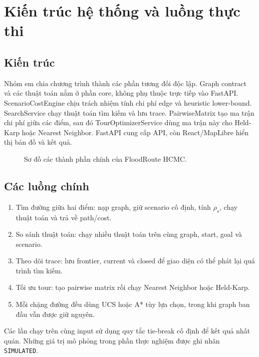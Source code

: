 \section{Kiến trúc hệ thống và luồng thực thi}
\subsection{Kiến trúc}
Nhóm em chia chương trình thành các phần tương đối độc lập. Graph contract và các thuật toán nằm ở phần core, không phụ thuộc trực tiếp vào FastAPI. ScenarioCostEngine chịu trách nhiệm tính chi phí edge và heuristic lower-bound. SearchService chạy thuật toán tìm kiếm và lưu trace. PairwiseMatrix tạo ma trận chi phí giữa các điểm, sau đó TourOptimizerService dùng ma trận này cho Held-Karp hoặc Nearest Neighbor. FastAPI cung cấp API, còn React/MapLibre hiển thị bản đồ và kết quả.

\begin{figure}[htbp]
\centering
{}
\caption{Sơ đồ các thành phần chính của FloodRoute HCMC.}
\label{fig:architecture-flow}
\end{figure}

\subsection{Các luồng chính}
\begin{enumerate}
\item Tìm đường giữa hai điểm: nạp graph, giữ scenario cố định, tính \(\rho_s\), chạy thuật toán và trả về path/cost.
\item So sánh thuật toán: chạy nhiều thuật toán trên cùng graph, start, goal và scenario.
\item Theo dõi trace: lưu frontier, current và closed để giao diện có thể phát lại quá trình tìm kiếm.
\item Tối ưu tour: tạo pairwise matrix rồi chạy Nearest Neighbor hoặc Held-Karp.
\item Mỗi chặng đường đều dùng UCS hoặc A* tùy lựa chọn, trong khi graph ban đầu vẫn được giữ nguyên.
\end{enumerate}

Các lần chạy trên cùng input sử dụng quy tắc tie-break cố định để kết quả nhất quán. Những giá trị mô phỏng trong phần thực nghiệm được ghi nhãn \texttt{SIMULATED}.
